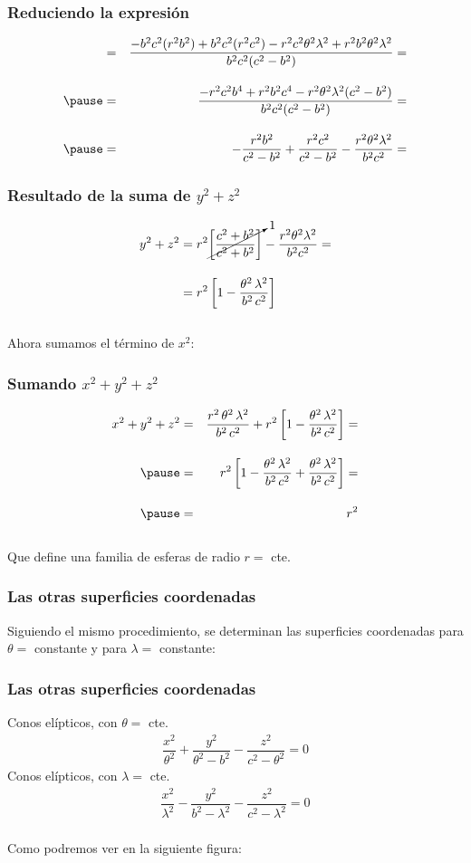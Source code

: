 \begin{frame}
\frametitle{Reduciendo la expresión}
\begin{eqnarray*}
&=& \dfrac{-b^{2} c^{2} (r^{2} b^{2}) + b^{2} c^{2} (r^{2} c^{2}) - r^{2} c^{2} \theta^{2} \lambda^{2} + r^{2} b^{2} \theta^{2} \lambda^{2}}{b^{2} c^{2} (c^{2} - b^{2})} = \\[1em] \pause
&=& \dfrac{-r^{2} c^{2} b^{4} + r^{2} b^{2} c^{4} - r^{2} \theta^{2} \lambda^{2} (c^{2} - b^{2})}{b^{2} c^{2} (c^{2} - b^{2})} = \\[1em] \pause
&=& - \dfrac{r^{2} b^{2}}{c^{2} - b^{2}} + \dfrac{r^{2} c^{2}}{c^{2} - b^{2}} - \dfrac{r^{2} \theta^{2} \lambda^{2}}{b^{2} c^{2}} =
\end{eqnarray*}
\end{frame}
\begin{frame}
\frametitle{Resultado de la suma de $y^{2} + z^{2}$}
\begin{align*}
y^{2} + z^{2} &= r^{2} \cancelto{1}{\left[ \dfrac{c^{2} + b^{2}}{c^{2} + b^{2}} \right]} - \dfrac{r^{2} \theta^{2} \lambda^{2}}{b^{2} c^{2}} = \\[1em]
&= r^{2} \left[ 1 - \dfrac{\theta^{2} \, \lambda^{2}}{b^{2} \, c^{2}} \right]
\end{align*}
\\
\bigskip
\pause
Ahora sumamos el término de $x^{2}$:
\end{frame}
\begin{frame}
\frametitle{Sumando $x^{2} + y^{2} + z^{2}$}
\begin{eqnarray*}
x^{2} + y^{2} + z^{2} &=& \dfrac{r^{2} \, \theta^{2} \, \lambda^{2}}{b^{2} \, c^{2}} + r^{2} \left[ 1 - \dfrac{\theta^{2} \, \lambda^{2}}{b^{2} \, c^{2}} \right] = \\[1em] \pause
&=& r^{2} \left[ 1 - \dfrac{\theta^{2} \, \lambda^{2}}{b^{2} \, c^{2}} + \dfrac{\theta^{2} \, \lambda^{2}}{b^{2} \, c^{2}} \right] = \\[1em] \pause
&=& r^{2}
\end{eqnarray*}
\\
\bigskip
\pause
Que define una familia de esferas de radio $r =$ cte.
\end{frame}
\begin{frame}
\frametitle{Las otras superficies coordenadas}
Siguiendo el mismo procedimiento, se determinan las superficies coordenadas para $\theta=$ constante y para $\lambda=$ constante:
\end{frame}
\begin{frame}
\frametitle{Las otras superficies coordenadas}
Conos elípticos, con $\theta=$ cte.
\begin{align*}
\dfrac{x^{2}}{\theta^{2}} + \dfrac{y^{2}}{\theta^{2} - b^{2}} - \dfrac{z^{2}}{c^{2} - \theta^{2}} = 0
\end{align*}
\pause
Conos elípticos, con $\lambda=$ cte.
\begin{align*}
\dfrac{x^{2}}{\lambda^{2}} - \dfrac{y^{2}}{b^{2} - \lambda^{2}} - \dfrac{z^{2}}{c^{2} - \lambda^{2}} = 0
\end{align*}
\\
\bigskip
Como podremos ver en la siguiente figura:
\end{frame}
